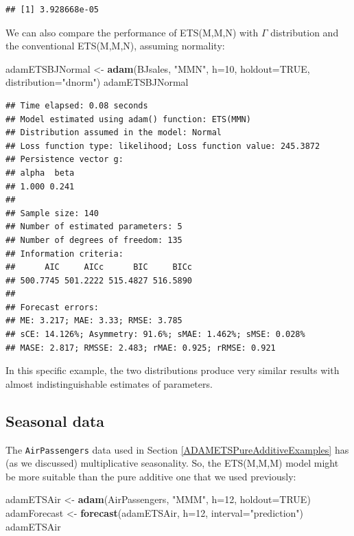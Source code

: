 \documentclass[]{book}
\newenvironment{Shaded}{\begin{snugshade}}{\end{snugshade}}
\newcommand{\DataTypeTok}[1]{\textcolor[rgb]{0.13,0.29,0.53}{#1}}
\newcommand{\DecValTok}[1]{\textcolor[rgb]{0.00,0.00,0.81}{#1}}
\newcommand{\KeywordTok}[1]{\textcolor[rgb]{0.13,0.29,0.53}{\textbf{#1}}}
\newcommand{\NormalTok}[1]{#1}
\newcommand{\OtherTok}[1]{\textcolor[rgb]{0.56,0.35,0.01}{#1}}
\newcommand{\StringTok}[1]{\textcolor[rgb]{0.31,0.60,0.02}{#1}}
\theoremstyle{definition}
\theoremstyle{definition}
\theoremstyle{definition}
\theoremstyle{definition}
\theoremstyle{remark}
\begin{document}
\begin{verbatim}
## [1] 3.928668e-05
\end{verbatim}

We can also compare the performance of ETS(M,M,N) with \(\Gamma\) distribution and the conventional ETS(M,M,N), assuming normality:

\begin{Shaded}
\begin{Highlighting}[]
\NormalTok{adamETSBJNormal <-}\StringTok{ }\KeywordTok{adam}\NormalTok{(BJsales, }\StringTok{"MMN"}\NormalTok{, }\DataTypeTok{h=}\DecValTok{10}\NormalTok{, }\DataTypeTok{holdout=}\OtherTok{TRUE}\NormalTok{,}
                        \DataTypeTok{distribution=}\StringTok{"dnorm"}\NormalTok{)}
\NormalTok{adamETSBJNormal}
\end{Highlighting}
\end{Shaded}

\begin{verbatim}
## Time elapsed: 0.08 seconds
## Model estimated using adam() function: ETS(MMN)
## Distribution assumed in the model: Normal
## Loss function type: likelihood; Loss function value: 245.3872
## Persistence vector g:
## alpha  beta 
## 1.000 0.241 
## 
## Sample size: 140
## Number of estimated parameters: 5
## Number of degrees of freedom: 135
## Information criteria:
##      AIC     AICc      BIC     BICc 
## 500.7745 501.2222 515.4827 516.5890 
## 
## Forecast errors:
## ME: 3.217; MAE: 3.33; RMSE: 3.785
## sCE: 14.126%; Asymmetry: 91.6%; sMAE: 1.462%; sMSE: 0.028%
## MASE: 2.817; RMSSE: 2.483; rMAE: 0.925; rRMSE: 0.921
\end{verbatim}

In this specific example, the two distributions produce very similar results with almost indistinguishable estimates of parameters.

\hypertarget{seasonal-data}{%
\subsection{Seasonal data}\label{seasonal-data}}

The \texttt{AirPassengers} data used in Section \ref{ADAMETSPureAdditiveExamples} has (as we discussed) multiplicative seasonality. So, the ETS(M,M,M) model might be more suitable than the pure additive one that we used previously:

\begin{Shaded}
\begin{Highlighting}[]
\NormalTok{adamETSAir <-}\StringTok{ }\KeywordTok{adam}\NormalTok{(AirPassengers, }\StringTok{"MMM"}\NormalTok{, }\DataTypeTok{h=}\DecValTok{12}\NormalTok{, }\DataTypeTok{holdout=}\OtherTok{TRUE}\NormalTok{)}
\NormalTok{adamForecast <-}\StringTok{ }\KeywordTok{forecast}\NormalTok{(adamETSAir, }\DataTypeTok{h=}\DecValTok{12}\NormalTok{, }\DataTypeTok{interval=}\StringTok{"prediction"}\NormalTok{)}
\NormalTok{adamETSAir}
\end{Highlighting}
\end{Shaded}
\end{document}
